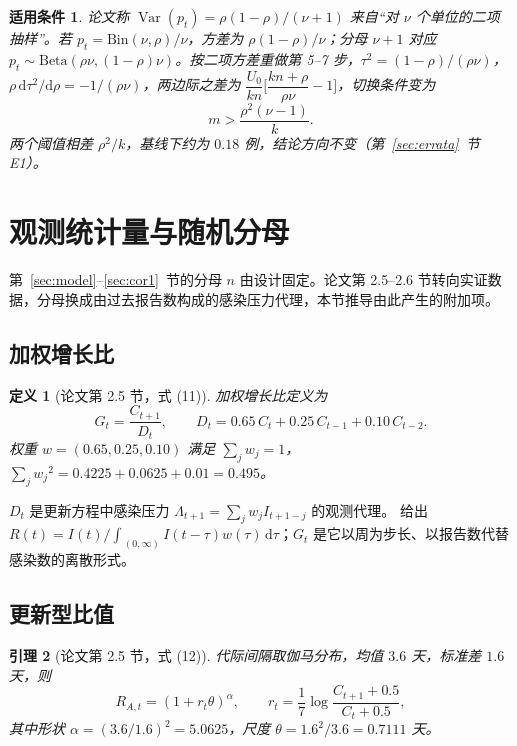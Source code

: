 \documentclass[fontset=none,11pt,a4paper,fleqn]{ctexart}
\numberwithin{equation}{section}
\theoremstyle{zhthm}
\newtheorem{definition}{定义}[section]
\newtheorem{lemma}[definition]{引理}
\theoremstyle{zhrem}
\newtheorem*{conditions}{适用条件}
\newcommand{\Var}{\operatorname{Var}}
\newcommand{\Bin}{\mathrm{Bin}}
\newcommand{\ptag}[1]{\tag*{论文 (#1)}}
\begin{document}
\begin{conditions}
论文称 $\Var(p_t)=\rho(1-\rho)/(\nu+1)$ 来自“对 $\nu$ 个单位的二项抽样”。若 $p_t=\Bin(\nu,\rho)/\nu$，方差为 $\rho(1-\rho)/\nu$；分母 $\nu+1$ 对应 $p_t\sim\mathrm{Beta}(\rho\nu,(1-\rho)\nu)$。按二项方差重做第 5--7 步，$\tau^2=(1-\rho)/(\rho\nu)$，$\rho\,\mathrm d\tau^2/\mathrm d\rho=-1/(\rho\nu)$，两边际之差为 $\dfrac{U_0}{kn}\Big[\dfrac{kn+\rho}{\rho\nu}-1\Big]$，切换条件变为
\begin{equation}\label{eq:cor1bin}
m>\frac{\rho^2(\nu-1)}{k} .
\end{equation}
两个阈值相差 $\rho^2/k$，基线下约为 $0.18$ 例，结论方向不变（第~\ref{sec:errata}~节 E1）。
\end{conditions}

\section{观测统计量与随机分母}\label{sec:observed}

第~\ref{sec:model}--\ref{sec:cor1}~节的分母 $n$ 由设计固定。论文第 2.5--2.6 节转向实证数据，分母换成由过去报告数构成的感染压力代理，本节推导由此产生的附加项。

\subsection{加权增长比}

\begin{definition}[论文第 2.5 节，式 (11)]\label{def:G}
加权增长比定义为
\begin{equation}
G_t=\frac{C_{t+1}}{D_t},\qquad D_t=0.65\,C_t+0.25\,C_{t-1}+0.10\,C_{t-2} .
\ptag{11}
\end{equation}
权重 $w=(0.65,0.25,0.10)$ 满足 $\sum_jw_j=1$，$\sum_j{w_j}^2=0.4225+0.0625+0.01=0.495$。
\end{definition}

$D_t$ 是更新方程中感染压力 $\Lambda_{t+1}=\sum_jw_jI_{t+1-j}$ 的观测代理。\citet[式 (7)]{fraser2007estimating} 给出 $R(t)=I(t)\big/\int_{\,(0,\infty)} I(t-\tau)w(\tau)\,\mathrm d\tau$；$G_t$ 是它以周为步长、以报告数代替感染数的离散形式。

\subsection{更新型比值}

\begin{lemma}[论文第 2.5 节，式 (12)]\label{lem:RA}
代际间隔取伽马分布，均值 $3.6$ 天，标准差 $1.6$ 天，则
\begin{equation}
R_{A,t}=(1+r_t\theta)^{\alpha},\qquad r_t=\frac17\log\frac{C_{t+1}+0.5}{C_t+0.5},
\ptag{12}
\end{equation}
其中形状 $\alpha=(3.6/1.6)^2=5.0625$，尺度 $\theta=1.6^2/3.6=0.7111$ 天。
\end{lemma}
\end{document}
